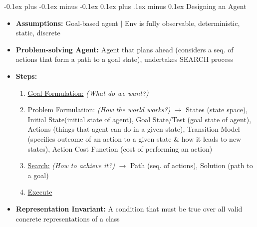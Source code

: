 \documentclass[landscape]{article}
\makeatletter
\renewcommand{\subsection}{\@startsection{subsection}{2}{0mm}%
  {-0.1ex plus -0.1ex minus -0.1ex}%
  {0.1ex plus .1ex minus 0.1ex}%
{\normalfont\scriptsize\bfseries}}
\makeatother
\begin{document}
\begin{multicols*}{5}
    \subsection{Designing an Agent}
    \begin{itemize}
      \item \textbf{Assumptions:} Goal-based agent $\vert$ Env is fully observable, deterministic, static, discrete
      \item \textbf{Problem-solving Agent:} Agent that plans ahead (considers a seq. of actions that form a path to a goal state), undertakes SEARCH process
      \item \textbf{Steps:}
      \begin{enumerate}
        \item \underline{Goal Formulation:} \textit{(What do we want?)}
        \item \underline{Problem Formulation:} \textit{(How the world works?)} $\rightarrow$ States (state space), Initial State(initial state of agent), Goal State/Test (goal state of agent), Actions (things that agent can do in a given state), Transition Model (specifies outcome of an action to a given state \& how it leads to new states), Action Cost Function (cost of performing an action)
        \item \underline{Search:} \textit{(How to achieve it?)} $\rightarrow$ Path (seq. of actions), Solution (path to a goal)
        \item \underline{Execute}
      \end{enumerate}
      \item \textbf{Representation Invariant:} A condition that must be true over all valid concrete representations of a class
    \end{itemize}


\end{multicols*}
\end{document}
